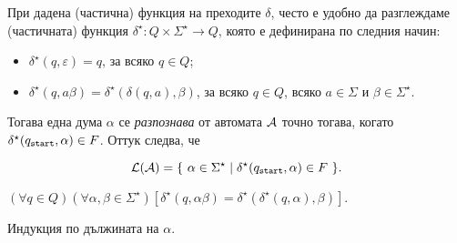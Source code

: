 При дадена (частична) функция на преходите $\delta$,
често е удобно да разглеждаме (частичната) функция $\delta^\star:Q\times\Sigma^\star \to Q$, която е дефинирана по следния начин:
\begin{itemize}
\item 
  $\delta^\star(q,\varepsilon) = q$, за всяко $q\in Q$;
\item
  $\delta^\star(q,a\beta) = \delta^\star(\delta(q,a),\beta)$, за всяко $q\in Q$, всяко $a\in\Sigma$ и $\beta\in\Sigma^\star$.
\end{itemize}
Тогава една дума $\alpha$ се {\em разпознава} от автомата $\mathcal{A}$ точно тогава, когато $\delta^\star(q_{\texttt{start}},\alpha) \in F$.
Оттук следва, че
\begin{framed}
\[\mathcal{L}(\mathcal{A}) = \{\ \alpha\in\Sigma^\star \mid \delta^\star(q_{\texttt{start}},\alpha) \in F\ \}.\]
\end{framed}

\begin{prop}
  $(\forall q\in Q)(\forall\alpha,\beta\in\Sigma^\star)[\delta^\star(q,\alpha\beta) = \delta^\star(\delta^\star(q,\alpha),\beta)]$.
\end{prop}
\begin{hint}
  Индукция по дължината на $\alpha$.
\end{hint}

